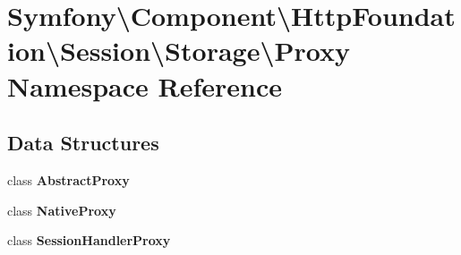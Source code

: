 \section{Symfony\textbackslash{}Component\textbackslash{}Http\+Foundation\textbackslash{}Session\textbackslash{}Storage\textbackslash{}Proxy Namespace Reference}
\label{namespace_symfony_1_1_component_1_1_http_foundation_1_1_session_1_1_storage_1_1_proxy}
\subsection*{Data Structures}
\begin{DoxyCompactItemize}
\item 
class {\bf Abstract\+Proxy}
\item 
class {\bf Native\+Proxy}
\item 
class {\bf Session\+Handler\+Proxy}
\end{DoxyCompactItemize}

